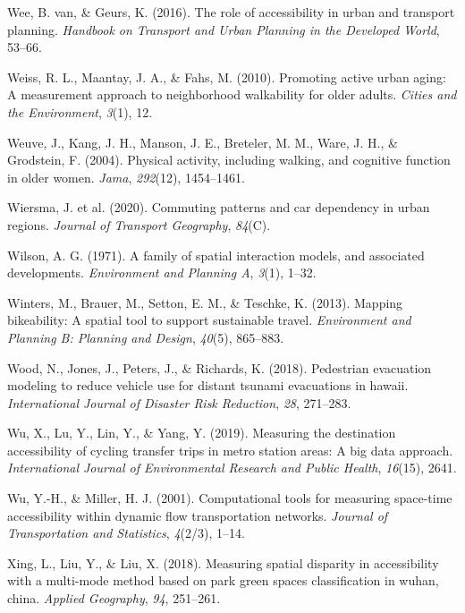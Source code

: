 \documentclass[
11pt, %
oneside, %
english, %
singlespacing, %
]{macthesis} %
\newlength{\cslhangindent}
\newenvironment{CSLReferences}[2] %
 {%
  \setlength{\parindent}{0pt}
  \ifodd #1 \everypar{\setlength{\hangindent}{\cslhangindent}}\ignorespaces\fi
  \ifnum #2 > 0
  \setlength{\parskip}{#2\baselineskip}
  \fi
 }%
 {}
\begin{document}
\begin{CSLReferences}{1}{0}
Wee, B. van, \& Geurs, K. (2016). The role of accessibility in urban and transport planning. \emph{Handbook on Transport and Urban Planning in the Developed World}, 53--66.

Weiss, R. L., Maantay, J. A., \& Fahs, M. (2010). Promoting active urban aging: A measurement approach to neighborhood walkability for older adults. \emph{Cities and the Environment}, \emph{3}(1), 12.

Weuve, J., Kang, J. H., Manson, J. E., Breteler, M. M., Ware, J. H., \& Grodstein, F. (2004). Physical activity, including walking, and cognitive function in older women. \emph{Jama}, \emph{292}(12), 1454--1461.

Wiersma, J. et al. (2020). Commuting patterns and car dependency in urban regions. \emph{Journal of Transport Geography}, \emph{84}(C).

Wilson, A. G. (1971). A family of spatial interaction models, and associated developments. \emph{Environment and Planning A}, \emph{3}(1), 1--32.

Winters, M., Brauer, M., Setton, E. M., \& Teschke, K. (2013). Mapping bikeability: A spatial tool to support sustainable travel. \emph{Environment and Planning B: Planning and Design}, \emph{40}(5), 865--883.

Wood, N., Jones, J., Peters, J., \& Richards, K. (2018). Pedestrian evacuation modeling to reduce vehicle use for distant tsunami evacuations in hawaii. \emph{International Journal of Disaster Risk Reduction}, \emph{28}, 271--283.

Wu, X., Lu, Y., Lin, Y., \& Yang, Y. (2019). Measuring the destination accessibility of cycling transfer trips in metro station areas: A big data approach. \emph{International Journal of Environmental Research and Public Health}, \emph{16}(15), 2641.

Wu, Y.-H., \& Miller, H. J. (2001). Computational tools for measuring space-time accessibility within dynamic flow transportation networks. \emph{Journal of Transportation and Statistics}, \emph{4}(2/3), 1--14.

Xing, L., Liu, Y., \& Liu, X. (2018). Measuring spatial disparity in accessibility with a multi-mode method based on park green spaces classification in wuhan, china. \emph{Applied Geography}, \emph{94}, 251--261.


\end{CSLReferences}
\end{document}
